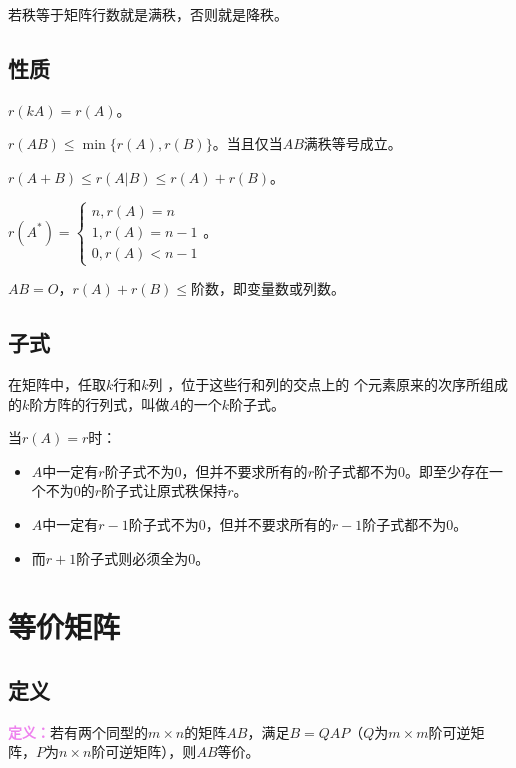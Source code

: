 \documentclass[UTF8, 12pt]{ctexart}
\begin{document}
若秩等于矩阵行数就是满秩，否则就是降秩。

\subsection{性质}

$r(kA)=r(A)$。

$r(AB)\leqslant\min\{r(A),r(B)\}$。当且仅当$AB$满秩等号成立。

$r(A+B)\leqslant r(A|B)\leqslant r(A)+r(B)$。

$r(A^*)=\left\{\begin{array}{l}
n, r(A)=n \\
1, r(A)=n-1 \\
0, r(A)<n-1
\end{array}\right.$。

$AB=O$，$r(A)+r(B)\leqslant$阶数，即变量数或列数。



\subsection{子式}

在矩阵中，任取$k$行和$k$列 ，位于这些行和列的交点上的 个元素原来的次序所组成的$k$阶方阵的行列式，叫做$A$的一个$k$阶子式。

当$r(A)=r$时：

\begin{itemize}
\item $A$中一定有$r$阶子式不为0，但并不要求所有的$r$阶子式都不为0。即至少存在一个不为0的$r$阶子式让原式秩保持$r$。
\item $A$中一定有$r-1$阶子式不为0，但并不要求所有的$r-1$阶子式都不为0。
\item 而$r+1$阶子式则必须全为0。
\end{itemize}

\section{等价矩阵}

\subsection{定义}

\textcolor{violet}{\textbf{定义：}}若有两个同型的$m\times n$的矩阵$AB$，满足$B=QAP$（$Q$为$m\times m$阶可逆矩阵，$P$为$n\times n$阶可逆矩阵），则$AB$等价。
\end{document}

